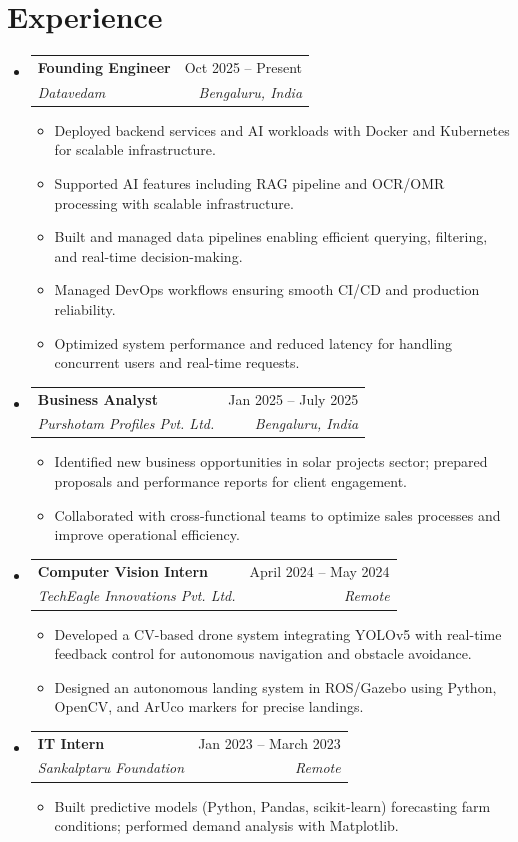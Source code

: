 \documentclass[letterpaper,10pt]{article}
\makeatletter
\newcommand{\resumeItem}[1]{
  \item\small{
    {#1 \vspace{-1pt}}
  }
}
\newcommand{\resumeSubheading}[4]{
  \vspace{-1pt}\item
    \begin{tabular*}{0.97\textwidth}[t]{l@{\extracolsep{\fill}}r}
      \textbf{#1} & #2 \\
      \textit{\small #3} & \textit{\small #4} \\
    \end{tabular*}\vspace{-5pt}
}
\newcommand{\resumeSubHeadingListStart}{\begin{itemize}[leftmargin=0.15in, label={}]}
\newcommand{\resumeSubHeadingListEnd}{\end{itemize}\vspace{-5pt}}
\newcommand{\resumeItemListStart}{\begin{itemize}\vspace{-3pt}}
\newcommand{\resumeItemListEnd}{\end{itemize}\vspace{-2pt}}
\makeatother
\begin{document}
\section{Experience}
\resumeSubHeadingListStart
    \resumeSubheading
      {Founding Engineer}{Oct 2025 -- Present}
      {Datavedam}{Bengaluru, India}
      \resumeItemListStart
        \resumeItem{Deployed backend services and AI workloads with Docker and Kubernetes for scalable infrastructure.}
        \resumeItem{Supported AI features including RAG pipeline and OCR/OMR processing with scalable infrastructure.}
        \resumeItem{Built and managed data pipelines enabling efficient querying, filtering, and real-time decision-making.}
        \resumeItem{Managed DevOps workflows ensuring smooth CI/CD and production reliability.}
        \resumeItem{Optimized system performance and reduced latency for handling concurrent users and real-time requests.}
      \resumeItemListEnd
    \resumeSubheading
      {Business Analyst}{Jan 2025 -- July 2025}
      {Purshotam Profiles Pvt. Ltd.}{Bengaluru, India}
      \resumeItemListStart
        \resumeItem{Identified new business opportunities in solar projects sector; prepared proposals and performance reports for client engagement.}
        \resumeItem{Collaborated with cross-functional teams to optimize sales processes and improve operational efficiency.}
      \resumeItemListEnd
    \resumeSubheading
      {Computer Vision Intern}{April 2024 -- May 2024}
      {TechEagle Innovations Pvt. Ltd.}{Remote}
      \resumeItemListStart
        \resumeItem{Developed a CV-based drone system integrating YOLOv5 with real-time feedback control for autonomous navigation and obstacle avoidance.}
        \resumeItem{Designed an autonomous landing system in ROS/Gazebo using Python, OpenCV, and ArUco markers for precise landings.}
      \resumeItemListEnd
    \resumeSubheading
      {IT Intern}{Jan 2023 -- March 2023}
      {Sankalptaru Foundation}{Remote}
      \resumeItemListStart
        \resumeItem{Built predictive models (Python, Pandas, scikit-learn) forecasting farm conditions; performed demand analysis with Matplotlib.}
      \resumeItemListEnd
\resumeSubHeadingListEnd
\end{document}
